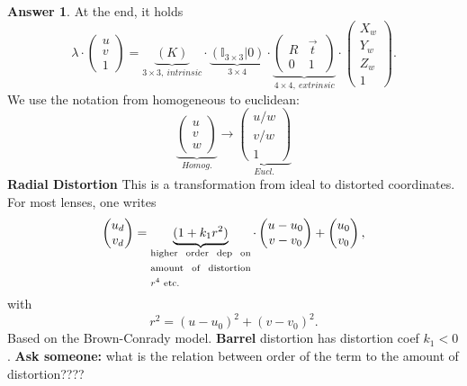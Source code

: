 \documentclass[a4paper,12 pt]{article}
\theoremstyle{definition}
\theoremstyle{remark}
\theoremstyle{definition}
\theoremstyle{definition}
\theoremstyle{definition}
\theoremstyle{definition}
\theoremstyle{remark}
\theoremstyle{remark}
\theoremstyle{definition}
\theoremstyle{definition}
\newtheorem*{answer}{Answer}
\begin{document}
\begin{enumerate}
\begin{enumerate}
\begin{answer}
 At the end, it holds
\begin{equation}
\lambda \cdot \begin{pmatrix}
u\\
v\\
1
\end{pmatrix}=\underbrace{(K)}_{3\times 3,\ intrinsic}\cdot \underbrace{(\mathbb{I}_{3\times 3}|0)}_{3\times 4}\cdot \underbrace{\begin{pmatrix}
 R&\vec{t} \ \\
 0&1
\end{pmatrix}}_{4\times 4, \ extrinsic}\cdot \begin{pmatrix}
X_w\\
Y_w\\
Z_w\\
1
\end{pmatrix}.
\end{equation}
We use the notation from homogeneous to euclidean:
\begin{equation}
\underbrace{\begin{pmatrix}
u \\
v\\
w
\end{pmatrix}}_{Homog.}\rightarrow 
\underbrace{\begin{pmatrix}
u/w \\
v/w\\
1
\end{pmatrix}}_{Eucl.}
\end{equation}
\textbf{Radial Distortion}
This is a transformation from ideal to distorted coordinates. For most lenses, one writes
\begin{equation}
\begin{pmatrix}
u_d\\
v_d
\end{pmatrix}=\underbrace{(1+k_1r^2)}_{\text{\parbox{10em}{higher order dep on amount of distortion $r^4$ etc.}}}\cdot \begin{pmatrix}
 u-u_0\\
 v-v_0
 \end{pmatrix}+\begin{pmatrix}
u_0\\
v_0
\end{pmatrix},
\end{equation}
with
\begin{equation}
r^2=(u-u_0)^2+(v-v_0)^2.
\end{equation}
Based on the Brown-Conrady model. \textbf{Barrel} distortion has distortion coef $k_1<0$. 
\textbf{Ask someone:} what is the relation between order of the term to the amount of distortion????

\end{answer}
\end{enumerate}
\end{enumerate}
\end{document}
